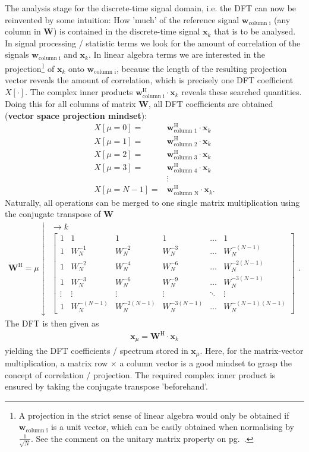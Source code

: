 \documentclass[11pt,a4paper,DIV=12]{scrartcl}
\begin{document}
The analysis stage for the discrete-time signal domain, i.e. the DFT
can now be reinvented by some intuition:
How 'much' of the reference signal $\bm{w}_{\text{column i}}$
(any column in $\bm{W}$)
is contained in the discrete-time signal $\bm{x}_k$ that is to be analysed.
%
In signal processing / statistic terms we look for the amount of correlation
of the signals
$\bm{w}_{\text{column i}}$ and $\bm{x}_k$.
%
In linear algebra terms we are interested in the projection\footnote{
A projection in the strict sense of linear algebra would only be obtained
if $\bm{w}_{\text{column i}}$
is a unit vector, which can be easily obtained when normalising by
$\frac{1}{\sqrt{N}}$. See the comment on the unitary matrix property
on pg.~\pageref{pg:unitary}.}
of $\bm{x}_k$ onto
$\bm{w}_{\text{column i}}$, because the length of the resulting projection vector
reveals the amount of correlation, which is precisely one DFT coefficient $X[\cdot]$.
%
The complex inner products $\bm{w}_{\text{column i}}^\text{H} \cdot \bm{x}_k$
reveals these searched quantities.
%
Doing this for all columns of matrix $\bm W$, all DFT coefficients are obtained
(\textbf{vector space projection mindset}):
\begin{align}
X[\mu=0] =& \bm{w}_{\text{column 1}}^\text{H} \cdot \bm{x}_k\\
X[\mu=1] =& \bm{w}_{\text{column 2}}^\text{H} \cdot \bm{x}_k\\
X[\mu=2] =& \bm{w}_{\text{column 3}}^\text{H} \cdot \bm{x}_k\\
X[\mu=3] =& \bm{w}_{\text{column 4}}^\text{H} \cdot \bm{x}_k\\
&\vdots\\
X[\mu=N-1] =& \bm{w}_{\text{column N}}^\text{H} \cdot \bm{x}_k.
\end{align}
%
Naturally, all operations can be merged to one single
matrix multiplication using the conjugate transpose of $\bm W$
%
\begin{align}
\bm{W}^\text{H} =
\mu \downarrow
\substack{\rightarrow k\\
\begin{bmatrix}
1 & 1 & 1 & 1 & \dots & 1\\[1em]
1 & W_N^{-1} & W_N^{-2} & W_N^{-3} & \dots & W_N^{-(N-1)}\\[1em]
1 & W_N^{-2} & W_N^{-4} & W_N^{-6} & \dots & W_N^{-2(N-1)}\\[1em]
1 & W_N^{-3} & W_N^{-6} & W_N^{-9} & \dots & W_N^{-3(N-1)}\\[1em]
\vdots & \vdots & \vdots &\vdots &\ddots & \vdots\\[1em]
1 & W_N^{-(N-1)} & W_N^{-2(N-1)} & W_N^{-3(N-1)} & \dots & W_N^{-(N-1)(N-1)}
\end{bmatrix}
}.
\end{align}
%
The DFT is then given as
\begin{align}
\label{eq:DFT_as_Matrix}
\bm{x}_\mu = \bm{W}^\text{H} \cdot \bm{x}_k
\end{align}
yielding the DFT coefficients / spectrum stored in $\bm{x}_\mu$.
%
Here, for the matrix-vector multiplication, a matrix row $\times$ a column vector
is a good mindset to grasp the concept of correlation / projection.
%
The required complex inner product is ensured by taking the conjugate transpose
'beforehand'.
\end{document}
